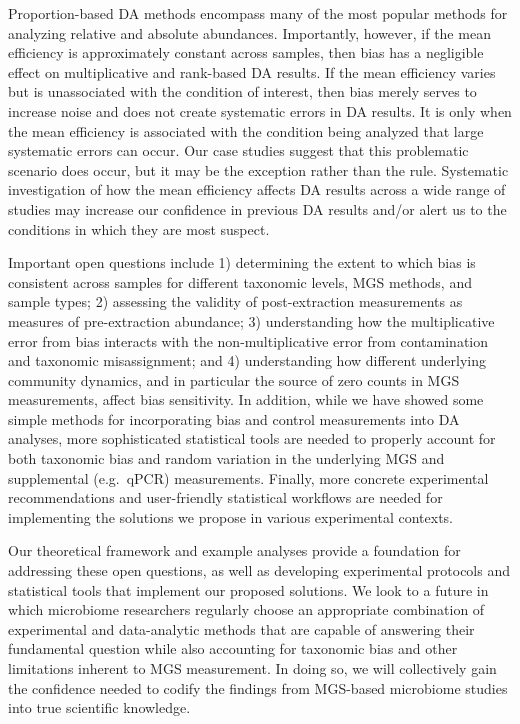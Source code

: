 \documentclass[
]{article}
\begin{document}
Proportion-based DA methods encompass many of the most popular methods for analyzing relative and absolute abundances.
Importantly, however, if the mean efficiency is approximately constant across samples, then bias has a negligible effect on multiplicative and rank-based DA results.
If the mean efficiency varies but is unassociated with the condition of interest, then bias merely serves to increase noise and does not create systematic errors in DA results.
It is only when the mean efficiency is associated with the condition being analyzed that large systematic errors can occur.
Our case studies suggest that this problematic scenario does occur, but it may be the exception rather than the rule.
Systematic investigation of how the mean efficiency affects DA results across a wide range of studies may increase our confidence in previous DA results and/or alert us to the conditions in which they are most suspect.

Important open questions include 1) determining the extent to which bias is consistent across samples for different taxonomic levels, MGS methods, and sample types; 2) assessing the validity of post-extraction measurements as measures of pre-extraction abundance; 3) understanding how the multiplicative error from bias interacts with the non-multiplicative error from contamination and taxonomic misassignment; and 4) understanding how different underlying community dynamics, and in particular the source of zero counts in MGS measurements, affect bias sensitivity.
In addition, while we have showed some simple methods for incorporating bias and control measurements into DA analyses, more sophisticated statistical tools are needed to properly account for both taxonomic bias and random variation in the underlying MGS and supplemental (e.g.~qPCR) measurements.
Finally, more concrete experimental recommendations and user-friendly statistical workflows are needed for implementing the solutions we propose in various experimental contexts.

Our theoretical framework and example analyses provide a foundation for addressing these open questions, as well as developing experimental protocols and statistical tools that implement our proposed solutions.
We look to a future in which microbiome researchers regularly choose an appropriate combination of experimental and data-analytic methods that are capable of answering their fundamental question while also accounting for taxonomic bias and other limitations inherent to MGS measurement.
In doing so, we will collectively gain the confidence needed to codify the findings from MGS-based microbiome studies into true scientific knowledge.
\end{document}
